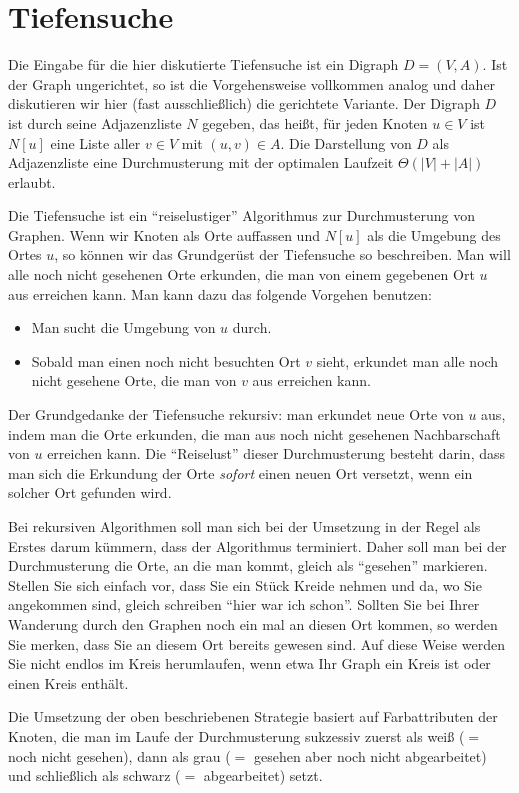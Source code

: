 \section{Tiefensuche}
\label{sect:tiefensuche}


\begin{bem} 
Die Eingabe für die hier diskutierte Tiefensuche ist ein Digraph $D=(V,A)$.
Ist der Graph ungerichtet, so ist die Vorgehensweise vollkommen analog und daher diskutieren wir hier (fast ausschließlich) die gerichtete Variante.
Der Digraph $D$ ist durch seine Adjazenzliste $N$ gegeben, das heißt, für jeden Knoten $u \in V$ ist $N[u]$ eine Liste aller $v \in V$ mit $(u,v) \in A$.
Die Darstellung von $D$ als Adjazenzliste eine Durchmusterung mit der optimalen Laufzeit $\Theta(|V|+|A|)$ erlaubt.
\end{bem}


\begin{bem} 
	Die Tiefensuche ist ein ``reiselustiger'' Algorithmus zur Durchmusterung von Graphen. Wenn wir Knoten als Orte auffassen und $N[u]$ als die Umgebung des Ortes $u$, so können wir das Grundgerüst der Tiefensuche so beschreiben. Man will alle noch nicht gesehenen Orte erkunden, die man von einem gegebenen Ort $u$ aus erreichen kann. Man kann dazu das folgende Vorgehen benutzen: 
	\begin{itemize} 
			\item Man sucht die Umgebung von $u$ durch. 
			\item Sobald man einen  noch nicht besuchten Ort $v$ sieht, erkundet man alle noch nicht gesehene Orte, die man von $v$ aus erreichen kann. 
	\end{itemize} 
	Der Grundgedanke  der Tiefensuche rekursiv: man erkundet neue Orte von $u$ aus, indem man die Orte erkunden, die man aus noch nicht gesehenen Nachbarschaft von $u$ erreichen kann. Die ``Reiselust'' dieser Durchmusterung besteht darin, dass man sich die Erkundung der Orte \emph{sofort} einen neuen Ort versetzt, wenn ein solcher Ort gefunden wird.  
	
	
	Bei rekursiven Algorithmen soll man sich bei der Umsetzung in der Regel als Erstes darum kümmern, dass der Algorithmus terminiert. Daher soll man bei der Durchmusterung die Orte, an die man kommt, gleich als ``gesehen'' markieren.  Stellen Sie sich einfach vor, dass Sie ein Stück Kreide nehmen und da, wo Sie angekommen sind, gleich schreiben ``hier war ich schon''. Sollten Sie bei Ihrer Wanderung durch den Graphen noch ein mal an diesen Ort kommen,  so werden Sie merken, dass Sie an diesem Ort bereits gewesen sind. Auf diese Weise werden Sie nicht endlos im Kreis herumlaufen, wenn etwa Ihr Graph ein Kreis ist oder einen Kreis enthält. 
	
	Die Umsetzung der oben beschriebenen Strategie basiert auf Farbattributen der Knoten, die man im Laufe der Durchmusterung sukzessiv zuerst als weiß ($=$ noch nicht gesehen), dann als  grau ($=$ gesehen aber noch nicht abgearbeitet) und schließlich als  schwarz ($=$ abgearbeitet) setzt. 
\end{bem}

